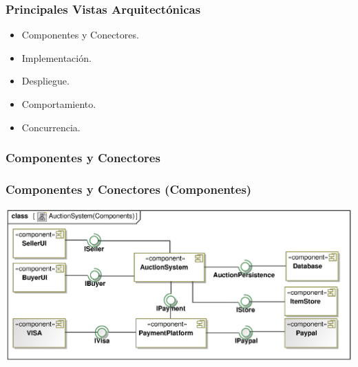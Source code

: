 ﻿\documentclass[handout,a4paper,slidestop,xcolor=pst,blue]{beamer}
\begin{document}
\begin{frame}[c]
	\frametitle{Principales Vistas Arquitectónicas}
	\begin{itemize}
		\item \alert<2->{Componentes y Conectores}.
		\item Implementación.
		\item Despliegue.
		\item Comportamiento.
		\item Concurrencia.
	\end{itemize}
\end{frame}

\subsubsection{Componentes y Conectores}

\begin{frame}[c]
	\frametitle{Componentes y Conectores (Componentes)}
	\begin{center}
		\includegraphics[width=\linewidth]{images/architecturalViews/componentConnector.eps}
	\end{center}
\end{frame}

%
%
%
\end{document}
